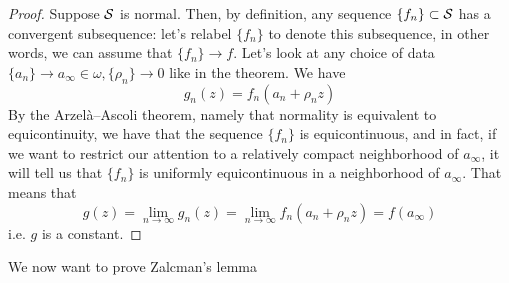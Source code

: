 \documentclass{article}
\begin{document}
\begin{proof}
Suppose \(\mathcal{S}\) is normal. Then, by definition, any sequence \(\{f_n\} \subset \mathcal{S}\) has a convergent subsequence: let's relabel \(\{f_n\}\) to denote this subsequence, in other words, we can assume that \(\{f_n\} \to f\). Let's look at any choice of data \(\{a_n\} \to a_\infty \in \omega, \{\rho_n\} \to 0\) like in the theorem. We have
\begin{equation}g_n(z) = f_n(a_n + \rho_nz)\end{equation}
By the Arzelà–Ascoli theorem, namely that normality is equivalent to equicontinuity, we have that the sequence \(\{f_n\}\) is equicontinuous, and in fact, if we want to restrict our attention to a relatively compact neighborhood of \(a_\infty\), it will tell us that \(\{f_n\}\) is uniformly equicontinuous in a neighborhood of \(a_\infty\). That means that
\begin{equation}g(z) = \lim_{n \to \infty}g_n(z) = \lim_{n \to \infty}f_n(a_n + \rho_nz) = f(a_\infty)\end{equation}
i.e. \(g\) is a constant.
\end{proof}
We now want to prove Zalcman's lemma
\end{document}
